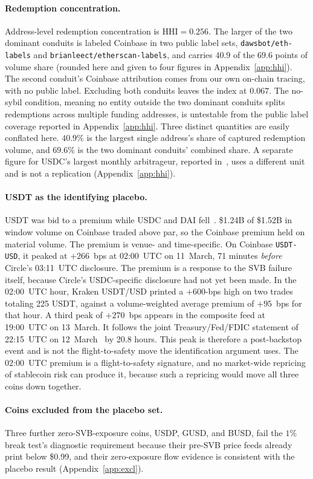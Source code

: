 \paragraph{Redemption concentration.} Address-level redemption concentration is
$\mathrm{HHI}=0.256$. The larger of the two dominant conduits is labeled
Coinbase in two public label sets, \texttt{dawsbot/eth-labels} and
\texttt{brianleect/etherscan-labels}, and carries $40.9$ of the $69.6$ points of volume
share (rounded here and given to four figures in Appendix~\ref{app:hhi}). The second conduit's Coinbase attribution comes
from our own on-chain tracing, with no public label. Excluding both conduits leaves the
index at $0.067$. The no-sybil condition, meaning no entity outside the two dominant conduits
splits redemptions across multiple funding addresses, is untestable from the public label
coverage reported in Appendix~\ref{app:hhi}.
Three distinct quantities are easily conflated here. $40.9\%$ is
the largest single address's share of captured redemption volume, and $69.6\%$ is the two
dominant conduits' combined share. A separate figure for USDC's largest monthly arbitrageur,
reported in~\cite{mzz2025}, uses a different unit and is not a replication
(Appendix~\ref{app:hhi}).

\paragraph{USDT as the identifying placebo.} USDT was bid to a premium while USDC and DAI
fell~\cite{Baur_2021}. \$1.24B of \$1.52B in window volume on Coinbase traded above par,
so the Coinbase premium held on material volume. The premium is
venue- and time-specific. On Coinbase \texttt{USDT-USD}, it peaked at $+266$~bps at
02:00~UTC on 11~March, 71 minutes \emph{before} Circle's 03:11~UTC disclosure. The premium
is a response to the SVB failure itself, because Circle's USDC-specific disclosure
had not yet been made. In the 02:00~UTC hour, Kraken USDT/USD printed a $+600$-bps high on two
trades totaling 225 USDT, against a volume-weighted average premium of $+95$~bps for that
hour. A third peak of $+270$~bps appears in the composite feed at
19:00~UTC on 13~March. It follows the joint Treasury/Fed/FDIC
statement of 22:15~UTC on 12~March~\cite{fedtreasfdic2023pressrelease} by 20.8 hours. This
peak is therefore a post-backstop event and is not the flight-to-safety move the
identification argument uses. The 02:00~UTC premium is a flight-to-safety signature, and
no market-wide repricing of stablecoin risk can produce it, because such a repricing would
move all three coins down together.

\paragraph{Coins excluded from the placebo set.} Three further zero-SVB-exposure coins,
USDP, GUSD, and BUSD, fail the $1\%$ break test's diagnostic requirement because their
pre-SVB price feeds already print below \$0.99, and their zero-exposure flow evidence is
consistent with the placebo result (Appendix~\ref{app:excl}).

